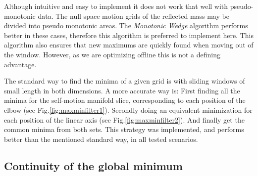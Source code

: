 Although intuitive and easy to implement it does not work that well with pseudo-monotonic data. The null space motion grids of the reflected mass may be divided into pseudo monotonic areas. The \textit{Monotonic Wedge} algorithm performs better in these cases, therefore this algorithm is preferred to implement here. This algorithm also ensures that new maximums are quickly found when moving out of the window. However, as we are optimizing offline this is not a defining advantage.






The standard way to find the minima of a given grid is with sliding windows of small length in both dimensions. A more accurate way is: First finding all the minima for the self-motion manifold slice, corresponding to each position of the elbow (see Fig.\ref{fig:maxminfilter1}). Secondly doing an equivalent minimization for each position of the linear axis (see Fig.\ref{fig:maxminfilter2}). 
And finally get the common minima from both sets. This strategy was implemented, and performs better than the mentioned standard way, in all tested scenarios. 

\subsection{Continuity of the global minimum}

